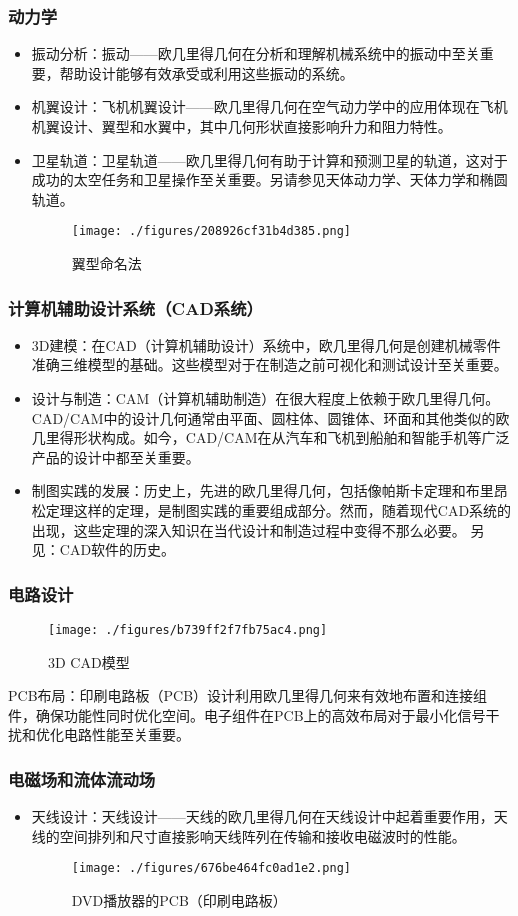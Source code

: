 \subsubsection{动力学}
\begin{itemize}
\item 振动分析：振动——欧几里得几何在分析和理解机械系统中的振动中至关重要，帮助设计能够有效承受或利用这些振动的系统。
\item 机翼设计：飞机机翼设计——欧几里得几何在空气动力学中的应用体现在飞机机翼设计、翼型和水翼中，其中几何形状直接影响升力和阻力特性。
\item 卫星轨道：卫星轨道——欧几里得几何有助于计算和预测卫星的轨道，这对于成功的太空任务和卫星操作至关重要。另请参见天体动力学、天体力学和椭圆轨道。
\begin{figure}[ht]
\centering
\texttt{[image: ./figures/208926cf31b4d385.png]}
\caption{翼型命名法} \label{fig_OJLJH_14}
\end{figure}
\end{itemize}
\subsubsection{计算机辅助设计系统（CAD系统）}
\begin{itemize}
\item 3D建模：在CAD（计算机辅助设计）系统中，欧几里得几何是创建机械零件准确三维模型的基础。这些模型对于在制造之前可视化和测试设计至关重要。  
\item 设计与制造：CAM（计算机辅助制造）在很大程度上依赖于欧几里得几何。CAD/CAM中的设计几何通常由平面、圆柱体、圆锥体、环面和其他类似的欧几里得形状构成。如今，CAD/CAM在从汽车和飞机到船舶和智能手机等广泛产品的设计中都至关重要。  
\item 制图实践的发展：历史上，先进的欧几里得几何，包括像帕斯卡定理和布里昂松定理这样的定理，是制图实践的重要组成部分。然而，随着现代CAD系统的出现，这些定理的深入知识在当代设计和制造过程中变得不那么必要。  
另见：CAD软件的历史。
\end{itemize}
\subsubsection{电路设计}
\begin{figure}[ht]
\centering
\texttt{[image: ./figures/b739ff2f7fb75ac4.png]}
\caption{3D CAD模型} \label{fig_OJLJH_15}
\end{figure}
PCB布局：印刷电路板（PCB）设计利用欧几里得几何来有效地布置和连接组件，确保功能性同时优化空间。电子组件在PCB上的高效布局对于最小化信号干扰和优化电路性能至关重要。
\subsubsection{电磁场和流体流动场 } 
\begin{itemize}
\item 天线设计：天线设计——天线的欧几里得几何在天线设计中起着重要作用，天线的空间排列和尺寸直接影响天线阵列在传输和接收电磁波时的性能。
\begin{figure}[ht]
\centering
\texttt{[image: ./figures/676be464fc0ad1e2.png]}
\caption{DVD播放器的PCB（印刷电路板）} \label{fig_OJLJH_16}
\end{figure}
\end{itemize}